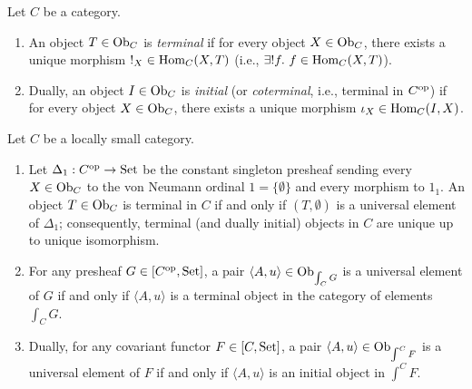 \documentclass[10pt,a4paper]{article}
\begin{document}
\begin{definition}\label{def:term_init}
Let $C$ be a category.
\begin{enumerate}
\item An object $T \in {\textrm{Ob}}_C$ is \emph{terminal} if for every object $X \in {\textrm{Ob}}_C$, there exists a unique morphism $!_X \in {\textrm{Hom}}_C(X, T)$ (i.e., $\exists !f.\ f \in {\textrm{Hom}}_C(X, T)$).
\item Dually, an object $I \in {\textrm{Ob}}_C$ is \emph{initial} (or \emph{coterminal}, i.e., terminal in $C^{\textrm{op}}$) if for every object $X \in {\textrm{Ob}}_C$, there exists a unique morphism $\iota_X \in {\textrm{Hom}}_C(I, X)$.
\end{enumerate}
\end{definition}

\begin{theorem}\label{thm:grothendieck_rep}
Let $C$ be a locally small category.
\begin{enumerate}
\item Let $\Delta_1 : C^{\textrm{op}} \to {\textrm{Set}}$ be the constant singleton presheaf sending every $X \in {\textrm{Ob}}_C$ to the von Neumann ordinal $1 = \{\emptyset\}$ and every morphism to $1_1$. An object $T \in {\textrm{Ob}}_C$ is terminal in $C$ if and only if $(T, \emptyset)$ is a universal element of $\Delta_1$; consequently, terminal (and dually initial) objects in $C$ are unique up to unique isomorphism.
\item For any presheaf $G \in [C^{\textrm{op}}, {\textrm{Set}}]$, a pair $\langle A, u \rangle \in {\textrm{Ob}}_{\int_C G}$ is a universal element of $G$ if and only if $\langle A, u \rangle$ is a terminal object in the category of elements $\int_C G$.
\item Dually, for any covariant functor $F \in [C, {\textrm{Set}}]$, a pair $\langle A, u \rangle \in {\textrm{Ob}}_{\int^C F}$ is a universal element of $F$ if and only if $\langle A, u \rangle$ is an initial object in $\int^C F$.
\end{enumerate}
\end{theorem}
\myprf
\end{document}
